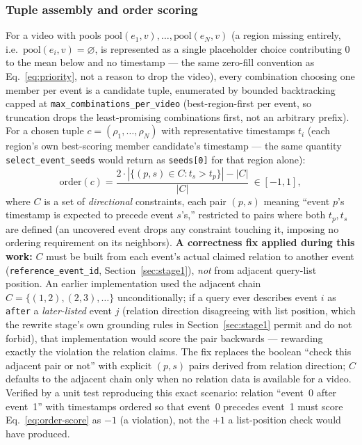 \documentclass[11pt]{article}
\newcommand{\code}[1]{\texttt{\small #1}}
\newcommand{\corr}[1]{\textbf{\textcolor{red!60!black}{#1}}}
\begin{document}
\subsubsection{Tuple assembly and order scoring}
For a video with pools $\mathrm{pool}(e_1,v),\dots,\mathrm{pool}(e_N,v)$
(a region missing entirely, i.e.\ $\mathrm{pool}(e_i,v)=\varnothing$, is
represented as a single placeholder choice contributing $0$ to the mean
below and no timestamp --- the same zero-fill convention as
Eq.~\ref{eq:priority}, not a reason to drop the video), every combination
choosing one member per event is a candidate tuple, enumerated by bounded
backtracking capped at \code{max\_combinations\_per\_video} (best-region-first
per event, so truncation drops the least-promising combinations first, not
an arbitrary prefix). For a chosen tuple $c=(\rho_1,\dots,\rho_N)$ with
representative timestamps $t_i$ (each region's own best-scoring member
candidate's timestamp --- the same quantity \code{select\_event\_seeds}
would return as \code{seeds[0]} for that region alone):
\begin{equation}
  \mathrm{order}(c) = \frac{2 \cdot |\{(p,s) \in C : t_s > t_p\}| - |C|}{|C|}
  \ \in [-1, 1],
  \label{eq:order-score}
\end{equation}
where $C$ is a set of \emph{directional} constraints, each pair
$(p,s)$ meaning ``event $p$'s timestamp is expected to precede event $s$'s,''
restricted to pairs where both $t_p,t_s$ are defined (an uncovered event
drops any constraint touching it, imposing no ordering requirement on its
neighbors). \corr{A correctness fix applied during this work:} $C$ must be
built from each event's actual claimed relation to another event
(\code{reference\_event\_id}, Section~\ref{sec:stage1}), \emph{not} from
adjacent query-list position. An earlier implementation used the adjacent
chain $C=\{(1,2),(2,3),\dots\}$ unconditionally; if a query ever describes
event $i$ as \code{after} a \emph{later-listed} event $j$ (relation
direction disagreeing with list position, which the rewrite stage's own
grounding rules in Section~\ref{sec:stage1} permit and do not forbid), that
implementation would score the pair backwards --- rewarding exactly the
violation the relation claims. The fix replaces the boolean
``check this adjacent pair or not'' with explicit
$(p,s)$ pairs derived from relation direction; $C$ defaults to the adjacent
chain only when no relation data is available for a video.
Verified by a unit test reproducing this exact scenario: relation
``event~0 after event~1'' with timestamps ordered so that event~0 precedes
event~1 must score Eq.~\ref{eq:order-score} as $-1$ (a violation), not the
$+1$ a list-position check would have produced.
\end{document}
